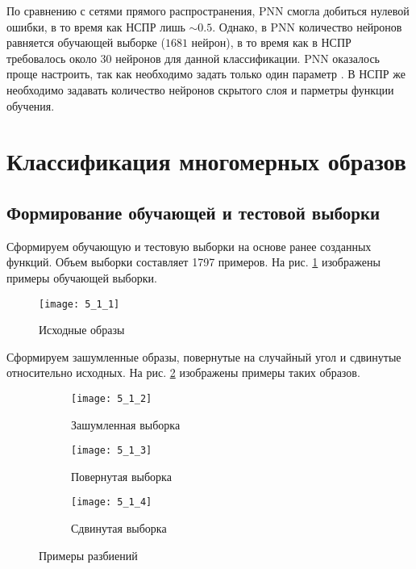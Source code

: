 По сравнению с сетями прямого распространения, PNN смогла добиться нулевой ошибки, в то время как НСПР лишь $\sim 0.5$. Однако, в PNN количество нейронов равняется обучающей выборке ($1681$ нейрон), в то время как в НСПР требовалось около $30$ нейронов для данной классификации. PNN оказалось проще настроить, так как необходимо задать только один параметр . В НСПР же необходимо задавать количество нейронов скрытого слоя и парметры функции обучения.

\newpage

\section{Классификация многомерных образов}

\subsection{Формирование обучающей и тестовой выборки}


Сформируем обучающую и тестовую выборки на основе ранее созданных функций. Объем выборки составляет 1797 примеров. На рис. \ref{fig:5_1_1} изображены примеры обучающей выборки.
\begin{figure}[H]
\begin{center}
	\texttt{[image: 5\_1\_1]}
	\caption{Исходные образы }
	\label{fig:5_1_1}
\end{center}
\end{figure}

Сформируем зашумленные образы, повернутые на случайный угол и сдвинутые относительно исходных. На рис. \ref{fig:5_1_2} изображены примеры таких образов.
\begin{figure}[H]
\begin{center}
	\begin{subfigure}[b]{\textwidth}
		\texttt{[image: 5\_1\_2]}
		\caption{Зашумленная выборка }
	\end{subfigure}
	\begin{subfigure}[b]{\textwidth}
		\texttt{[image: 5\_1\_3]}
		\caption{Повернутая выборка }
	\end{subfigure}
	\begin{subfigure}[b]{\textwidth}
		\texttt{[image: 5\_1\_4]}
		\caption{Сдвинутая выборка }
	\end{subfigure}
	\caption{Примеры разбиений}
	\label{fig:5_1_2}
\end{center}
\end{figure}

